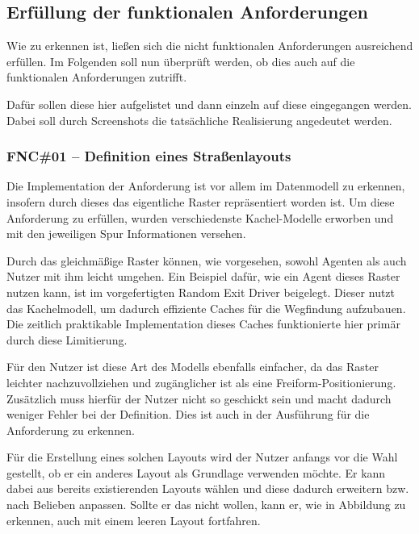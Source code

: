 \subsection{Erfüllung der funktionalen Anforderungen}

Wie zu erkennen ist, ließen sich die nicht funktionalen Anforderungen ausreichend erfüllen.
Im Folgenden soll nun überprüft werden, ob dies auch auf die funktionalen Anforderungen zutrifft.

Dafür sollen diese hier aufgelistet und dann einzeln auf diese eingegangen werden.
Dabei soll durch Screenshots die tatsächliche Realisierung angedeutet werden.

\subsubsection{FNC\#01 – Definition eines Straßenlayouts}

Die Implementation der Anforderung  ist vor allem im Datenmodell zu erkennen, insofern durch dieses das eigentliche Raster repräsentiert worden ist.
Um diese Anforderung zu erfüllen, wurden verschiedenste Kachel-Modelle erworben und mit den jeweiligen Spur Informationen versehen.

Durch das gleichmäßige Raster können, wie vorgesehen, sowohl Agenten als auch Nutzer mit ihm leicht umgehen.
Ein Beispiel dafür, wie ein Agent dieses Raster nutzen kann, ist im vorgefertigten Random Exit Driver beigelegt.
Dieser nutzt das Kachelmodell, um dadurch effiziente Caches für die Wegfindung aufzubauen.
Die zeitlich praktikable Implementation dieses Caches funktionierte hier primär durch diese Limitierung.

Für den Nutzer ist diese Art des Modells ebenfalls einfacher, da das Raster leichter nachzuvollziehen und zugänglicher ist als eine Freiform-Positionierung.
Zusätzlich muss hierfür der Nutzer nicht so geschickt sein und macht dadurch weniger Fehler bei der Definition.
Dies ist auch in der Ausführung für die Anforderung  zu erkennen.

Für die Erstellung eines solchen Layouts wird der Nutzer anfangs vor die Wahl gestellt, ob er ein anderes Layout als Grundlage verwenden möchte.
Er kann dabei aus bereits existierenden Layouts wählen und diese dadurch erweitern bzw. nach Belieben anpassen.
Sollte er das nicht wollen, kann er, wie in Abbildung  zu erkennen, auch mit einem leeren Layout fortfahren.


